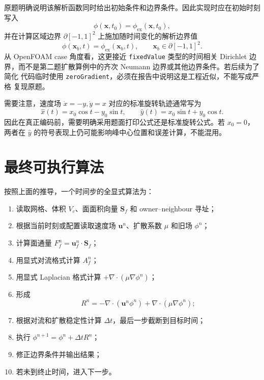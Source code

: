 \documentclass[UTF8,12pt,a4paper]{ctexart}
\numberwithin{equation}{section}
\newcommand{\Sf}{\bm S}
\newcommand{\xf}{\bm x}
\newcommand{\uf}{\bm u}
\begin{document}
原题明确说明该解析函数同时给出初始条件和边界条件。因此实现时应在初始时刻写入
\begin{equation}
  \phi(\xf,t_0)=\phi_{\mathrm{ex}}(\xf,t_0),
  \label{eq:peak_initial_condition}
\end{equation}
并在计算区域边界 $\partial[-1,1]^2$ 上施加随时间变化的解析边界值
\begin{equation}
  \phi(\xf_b,t)=\phi_{\mathrm{ex}}(\xf_b,t),
  \qquad
  \xf_b\in\partial[-1,1]^2.
  \label{eq:peak_boundary_condition}
\end{equation}
从 OpenFOAM case 角度看，这更接近 \texttt{fixedValue} 类型的时间相关 Dirichlet
边界，而不是第二题扩散算例中的齐次 Neumann 边界或其他边界条件。若后续为了简化
代码临时使用 \texttt{zeroGradient}，必须在报告中说明这是工程近似，不能写成严格
复现原题。

需要注意，速度场 $\dot x=-y,\dot y=x$ 对应的标准旋转轨迹通常写为
\begin{equation}
  \widehat x(t)=x_0\cos t-y_0\sin t,
  \qquad
  \widehat y(t)=x_0\sin t+y_0\cos t.
  \label{eq:peak_center_standard}
\end{equation}
因此在真正编码前，需要明确采用题面打印公式还是标准旋转公式。若 $x_0=0$，两者在
$\widehat y$ 的符号表现上仍可能影响峰中心位置和误差计算，不能混用。

\section{最终可执行算法}

按照上面的推导，一个时间步的全显式算法为：
\begin{enumerate}
  \item 读取网格、体积 $V_c$、面面积向量 $\Sf_f$ 和 owner--neighbour 寻址；
  \item 根据当前时刻或配置读取速度场 $\uf^n$、扩散系数 $\mu$ 和旧场 $\phi^n$；
  \item 计算面通量 $F_f^n=\uf_f^n\cdot\Sf_f$；
  \item 用显式对流格式计算 $A_f^n$；
  \item 用显式 Laplacian 格式计算 $+\nabla\cdot(\mu\nabla\phi^n)$；
  \item 形成
        \[
          R^n=-\nabla\cdot(\uf^n\phi^n)+\nabla\cdot(\mu\nabla\phi^n);
        \]
  \item 根据对流和扩散稳定性计算 $\Delta t$，最后一步截断到目标时间；
  \item 执行 $\phi^{n+1}=\phi^n+\Delta tR^n$；
  \item 修正边界条件并输出结果；
  \item 若未到终止时间，进入下一步。
\end{enumerate}
\end{document}
